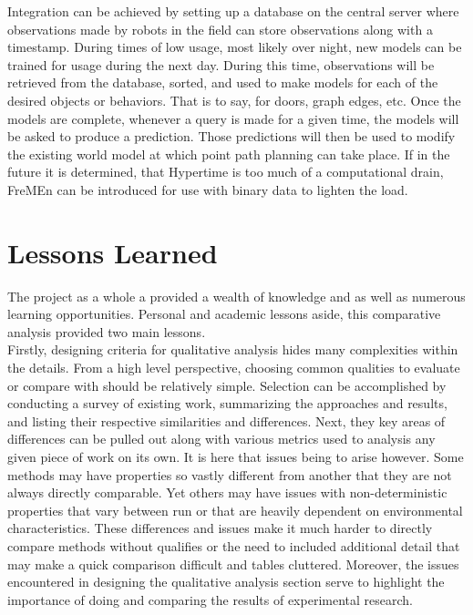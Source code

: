     Integration can be achieved by setting up a database on the central server
    where observations made by robots in the field can store observations along
    with a timestamp. During times of low usage, most likely over night, new
    models can be trained for usage during the next day. During this time,
    observations will be retrieved from the database, sorted, and used to make
    models for each of the desired objects or behaviors. That is to say, for
    doors, graph edges, etc. Once the models are complete, whenever a query is
    made for a given time, the models will be asked to produce a prediction.
    Those predictions will then be used to modify the existing world model at
    which point path planning can take place. If in the future it is
    determined, that Hypertime is too much of a computational drain, FreMEn
    can be introduced for use with binary data to lighten the load. \\


    \section{ Lessons Learned }

    The project as a whole a provided a wealth of knowledge and as well as
    numerous learning opportunities. Personal and academic lessons aside, this
    comparative analysis provided two main lessons. \\

    Firstly, designing criteria for qualitative analysis hides many complexities
    within the details. From a high level perspective, choosing common
    qualities to evaluate or compare with should be relatively simple.
    Selection can be accomplished by conducting a survey of existing work,
    summarizing the approaches and results, and listing their respective
    similarities and differences. Next, they key areas of differences can be
    pulled out along with various metrics used to analysis any given piece of
    work on its own. It is here that issues being to arise however. Some methods
    may have properties so vastly different from another that they are not
    always directly comparable. Yet others may have issues with non-deterministic
    properties that vary between run or that are heavily dependent on environmental
    characteristics. These differences and issues make it much harder to directly
    compare methods without qualifies or the need to included additional detail
    that may make a quick comparison difficult and tables cluttered. Moreover,
    the issues encountered in designing the qualitative analysis section serve
    to highlight the importance of doing and comparing the results of experimental
    research. \\

